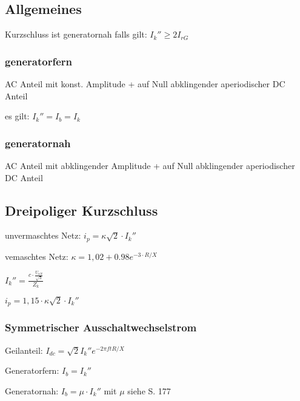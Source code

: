 \documentclass[german]{latex4ei/latex4ei_sheet}
\begin{document}
\begin{sectionbox}
\subsection{Allgemeines}
 Kurzschluss ist generatornah falls gilt: $I_k'' \ge 2 I_{rG}$

\subsubsection{generatorfern}
AC Anteil mit konst. Amplitude + auf Null abklingender aperiodischer DC Anteil

es gilt: $I_k'' = I_b = I_k$

\subsubsection{generatornah}
AC Anteil mit abklingender Amplitude + auf Null abklingender aperiodischer DC Anteil
\end{sectionbox}

\begin{sectionbox}
\subsection{Dreipoliger Kurzschluss}

unvermaschtes Netz: $i_p = \kappa \sqrt 2 \cdot I_k''$

vemaschtes Netz:
$\kappa = 1,02 + 0.98 e^{-3 \cdot  R/X}$

\begin{emphbox}
  $I_k'' = \frac{c \cdot \frac{U_{nN}}{\sqrt{3}}}{Z_k}$
\end{emphbox}

$i_p = 1,15 \cdot \kappa \sqrt 2 \cdot I_k''$

\subsubsection{Symmetrischer Ausschaltwechselstrom}

Geilanteil: $I_{dc} = \sqrt 2 I_k'' e^{- 2 \pi f t R/X}$

Generatorfern: $I_b = I_k''$

Generatornah: $I_b = \mu \cdot I_k''$ mit
$\mu $ siehe S. 177
\end{sectionbox}
\end{document}

